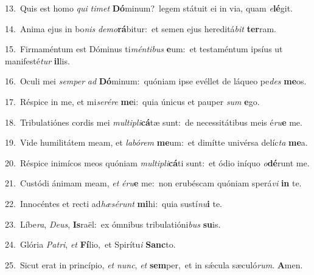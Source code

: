 {\numbfont\textcolor{\numbcolor}{13.}}~Quis est homo \textit{qui} \textit{ti}\-\textit{met} \textbf{Dó}\-minum?~\star legem státuit ei in via, quam \textit{e}\-\textbf{lé}git.\par
{\numbfont\textcolor{\numbcolor}{14.}}~Anima ejus in bo\textit{nis} \textit{de}\-\textit{mo}\textbf{rá}bitur:~\star et semen ejus hereditá\textit{bit} \textbf{ter}\-ram.\par
{\numbfont\textcolor{\numbcolor}{15.}}~Firmaméntum est Dóminus ti\-\textit{mén}\-\textit{ti}\textit{bus} \textbf{e}\-um:~\star et testaméntum ipsíus ut manifesté\textit{tur} \textbf{il}\-lis.\par
{\numbfont\textcolor{\numbcolor}{16.}}~Oculi mei \textit{sem}\-\textit{per} \textit{ad} \textbf{Dó}\-minum:~\star quóniam ipse evéllet de láqueo pe\textit{des} \textbf{me}\-os.\par
{\numbfont\textcolor{\numbcolor}{17.}}~Réspice in me, et mi\-\textit{se}\-\textit{ré}\textit{re} \textbf{me}\-i:~\star quia únicus et pauper \textit{sum} \textbf{e}\-go.\par
{\numbfont\textcolor{\numbcolor}{18.}}~Tribulatiónes cordis mei \textit{mul}\-\textit{ti}\textit{pli}\textbf{cá}tæ sunt:~\star de necessitátibus meis é\-\textit{ru}\-\textbf{e} me.\par
{\numbfont\textcolor{\numbcolor}{19.}}~Vide humilitátem meam, et \textit{la}\-\textit{bó}\textit{rem} \textbf{me}\-um:~\star et dimítte univérsa delíc\textit{ta} \textbf{me}\-a.\par
{\numbfont\textcolor{\numbcolor}{20.}}~Réspice inimícos meos quóniam \textit{mul}\-\textit{ti}\textit{pli}\textbf{cá}ti sunt:~\star et ódio iníquo \textit{o}\-\textbf{dé}runt me.\par
{\numbfont\textcolor{\numbcolor}{21.}}~Custódi ánimam meam, \textit{et} \textit{é}\-\textit{ru}\textbf{e} me:~\star non erubéscam quóniam sperá\textit{vi} \textbf{in} te.\par
{\numbfont\textcolor{\numbcolor}{22.}}~Innocéntes et recti ad\-\textit{hæ}\-\textit{sé}\textit{runt} \textbf{mi}\-hi:~\star quia sustí\-\textit{nu}\-\textbf{i} te.\par
{\numbfont\textcolor{\numbcolor}{23.}}~Líbe\-\textit{ra}\-, \textit{De}\-\textit{us}, \textbf{Is}\-raël:~\star ex ómnibus tribulatióni\textit{bus} \textbf{su}\-is.\par
{\numbfont\textcolor{\numbcolor}{24.}}~Glória \textit{Pa}\-\textit{tri}, \textit{et} \textbf{Fí}\-lio,~\star et Spirítu\textit{i} \textbf{Sanc}\-to.\par
{\numbfont\textcolor{\numbcolor}{25.}}~Sicut erat in princípio, \textit{et} \textit{nunc}\-, \textit{et} \textbf{sem}\-per,~\star et in sǽcula sæculó\-\textit{rum}\-. \textbf{A}\-men.\par
